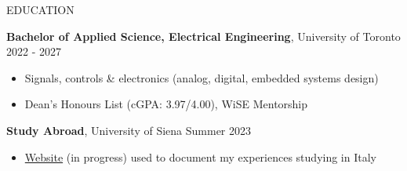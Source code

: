 \documentclass{resume}
\begin{document}



\begin{rSection}{EDUCATION}

    {\bf Bachelor of Applied Science, Electrical Engineering}, University of Toronto \hfill {2022 - 2027}
    \vspace{-0.2cm}
    \begin{itemize}
     \itemsep -8pt {} 
      \item Signals, controls \& electronics (analog, digital, embedded systems design) 
      \item Dean's Honours List (cGPA: 3.97/4.00), WiSE Mentorship
    \end{itemize}

    {\bf Study Abroad}, University of Siena \hfill {Summer 2023}
    \vspace{-0.2cm}
    \begin{itemize}
     \itemsep -8pt {} 
      \item  \href{https://github.com/endothermiic/serendipity}{Website} (in progress) used to document my experiences studying in Italy 
    \end{itemize}


\end{rSection}
\end{document}
